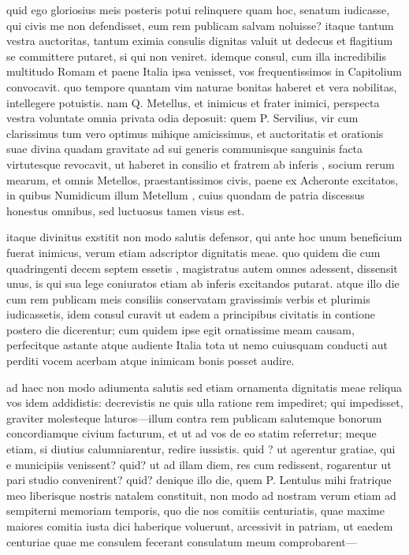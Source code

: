  quid ego gloriosius meis posteris potui relinquere quam hoc, senatum iudicasse, qui civis me non defendisset, eum rem publicam salvam noluisse? itaque tantum vestra auctoritas, tantum eximia consulis dignitas valuit ut dedecus et flagitium se committere putaret, si qui non veniret. idemque consul, cum illa incredibilis multitudo Romam et paene Italia ipsa venisset, vos frequentissimos in Capitolium convocavit. quo tempore quantam vim naturae bonitas haberet et vera nobilitas, intellegere potuistis. nam Q. Metellus, et inimicus et frater inimici, perspecta vestra voluntate omnia privata odia deposuit: quem P. Servilius, vir cum clarissimus tum vero optimus mihique amicissimus, et auctoritatis et orationis suae divina quadam gravitate ad sui generis communisque sanguinis facta virtutesque revocavit, ut haberet in consilio et fratrem ab inferis , socium rerum mearum, et omnis Metellos, praestantissimos civis, paene ex Acheronte excitatos, in quibus Numidicum illum Metellum , cuius quondam de patria discessus honestus omnibus, sed luctuosus tamen visus est.

 itaque divinitus exstitit non modo salutis defensor, qui ante hoc unum beneficium fuerat inimicus, verum etiam adscriptor dignitatis meae. quo quidem die cum quadringenti decem septem essetis , magistratus autem omnes adessent, dissensit unus, is qui sua lege coniuratos etiam ab inferis excitandos putarat. atque illo die cum rem publicam meis consiliis conservatam gravissimis verbis et plurimis iudicassetis, idem consul curavit ut eadem a principibus civitatis in contione postero die dicerentur; cum quidem ipse egit ornatissime meam causam, perfecitque astante atque audiente Italia tota ut nemo cuiusquam conducti aut perditi vocem acerbam atque inimicam bonis posset audire.

 ad haec non modo adiumenta salutis sed etiam ornamenta dignitatis meae reliqua vos idem addidistis: decrevistis ne quis ulla ratione rem impediret; qui impedisset, graviter molesteque laturos—illum contra rem publicam salutemque bonorum concordiamque civium facturum, et ut ad vos de eo statim referretur; meque etiam, si diutius calumniarentur, redire iussistis. quid ? ut agerentur gratiae, qui e municipiis venissent? quid? ut ad illam diem, res cum redissent, rogarentur ut pari studio convenirent? quid? denique illo die, quem P. Lentulus mihi fratrique meo liberisque nostris natalem constituit, non modo ad nostram verum etiam ad sempiterni memoriam temporis, quo die nos comitiis centuriatis, quae maxime maiores comitia iusta dici haberique voluerunt, arcessivit in patriam, ut eaedem centuriae quae me consulem fecerant consulatum meum comprobarent—

